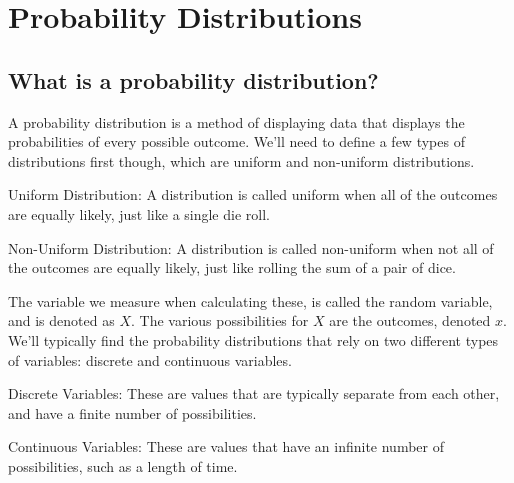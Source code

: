 \section{Probability Distributions}

    \subsection{What is a probability distribution?}
    A probability distribution is a method of displaying data that displays the probabilities of every possible outcome. We'll need to define a few types of distributions first though, which are uniform and non-uniform distributions.
    \begin{definition}
        Uniform Distribution: A distribution is called uniform when all of the outcomes are equally likely, just like a single die roll.
    \end{definition}
    \begin{definition}
        Non-Uniform Distribution: A distribution is called non-uniform when not all of the outcomes are equally likely, just like rolling the sum of a pair of dice.
    \end{definition}
    The variable we measure when calculating these, is called the random variable, and is denoted as $X$. The various possibilities for $X$ are the outcomes, denoted $x$. We'll typically find the probability distributions that rely on two different types of variables: discrete and continuous variables. 
    \begin{definition}
        Discrete Variables: These are values that are typically separate from each other, and have a finite number of possibilities.
    \end{definition}
    \begin{definition}
        Continuous Variables: These are values that have an infinite number of possibilities, such as a length of time.
    \end{definition}
    
